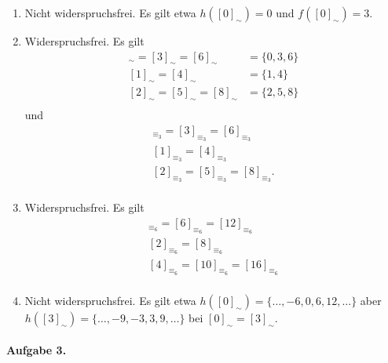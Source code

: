 \documentclass{article}
\begin{document}
\begin{enumerate}[label=\alph*)]
    \item Nicht widerspruchsfrei. Es gilt etwa $h([0]_\sim) = 0$ und $f([0]_\sim) = 3$.
    
    \item Widerspruchsfrei. Es gilt
    \begin{align*}
        [0]_\sim = [3]_\sim = [6]_\sim &= \{ 0, 3, 6 \} \\
        [1]_\sim = [4]_\sim &= \{ 1, 4 \} \\
        [2]_\sim = [5]_\sim = [8]_\sim &= \{ 2, 5, 8 \} \\
    \end{align*}
    und
    \begin{align*}
        [0]_{\equiv_3} = [3]_{\equiv_3} = [6]_{\equiv_3} \\
        [1]_{\equiv_3} = [4]_{\equiv_3} \\
        [2]_{\equiv_3} = [5]_{\equiv_3} = [8]_{\equiv_3}. \\
    \end{align*}

    \item Widerspruchsfrei. Es gilt
    \begin{align*}
        [0]_{\equiv_6} = [6]_{\equiv_6} = [12]_{\equiv_6} \\
        [2]_{\equiv_6} = [8]_{\equiv_6} \\
        [4]_{\equiv_6} = [10]_{\equiv_6} = [16]_{\equiv_6} \\
    \end{align*}

    \item Nicht widerspruchsfrei. Es gilt etwa $h([0]_\sim) = \{ \ldots, -6, 0, 6, 12, \ldots \}$ aber $h([3]_\sim) = \{ \ldots, -9, -3, 3, 9, \ldots \}$ bei $[0]_\sim = [3]_\sim$.
\end{enumerate}

\paragraph{Aufgabe 3.}
\end{document}

